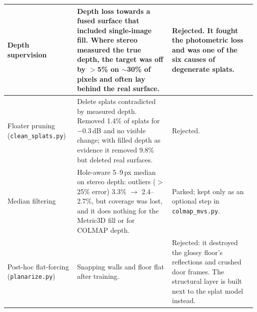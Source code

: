 {\begin{longtable}{p{}p{}p{}}
Depth supervision & Depth loss towards a fused surface that included single-image fill. Where stereo measured the true depth, the target was off by $>$5\% on $\sim$30\% of pixels and often lay behind the real surface. & Rejected. It fought the photometric loss and was one of the six causes of degenerate splats. \\
\midrule
Floater pruning (\texttt{clean\_splats.py}) & Delete splats contradicted by measured depth. Removed 1.4\% of splats for $-0.3$\,dB and no visible change; with filled depth as evidence it removed 9.8\% but deleted real surfaces. & Rejected. \\
\midrule
Median filtering & Hole-aware 5--9\,px median on stereo depth: outliers ($>$25\% error) 3.3\% $\rightarrow$ 2.4--2.7\%, but coverage was lost, and it does nothing for the Metric3D fill or for COLMAP depth. & Parked; kept only as an optional step in \texttt{colmap\_mvs.py}. \\
\midrule
Post-hoc flat-forcing (\texttt{planarize.py}) & Snapping walls and floor flat after training. & Rejected: it destroyed the glossy floor's reflections and crushed door frames. The structural layer is built next to the splat model instead. \\
\bottomrule
\end{longtable}
}
